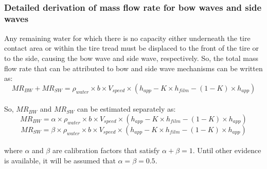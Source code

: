 \documentclass[12pt]{article}
\begin{document}
\begin{minipage}{\textwidth}
\end{minipage}\\


\subsubsection*{Detailed derivation of mass flow rate for bow waves and side waves}

Any remaining water for which there is no capacity either underneath the tire contact area or within the tire tread must be displaced to the front of the tire or to the side, causing the bow wave and side wave, respectively. So, the total mass flow rate that can be attributed to bow and side wave mechanisms can be written as:
 \[ 
\mathit{MR_{BW} + MR_{SW}} =  \rho_{water} \times b \times V_{speed} \times (h_{app} - K \times h_{film} - (1-K) \times h_{app}) \]
\\
So, $\mathit{MR_{BW}}$ and $\mathit{MR_{SW}}$ can be estimated separately as:
 \[ 
\mathit{MR_{BW}} =  \alpha \times \rho_{water} \times b \times V_{speed} \times (h_{app} - K \times h_{film} - (1-K) \times h_{app}) \]
 \[
\mathit{MR_{SW}} = \beta \times \rho_{water} \times b \times V_{speed} \times (h_{app} - K \times h_{film} - (1-K) \times h_{app}) \]
\\
where $\alpha$ and $\beta$ are calibration factors that satisfy $\alpha + \beta = 1$. Until other evidence is available, it will be assumed that $\alpha = \beta = 0.5$.


\newpage
\end{document}
